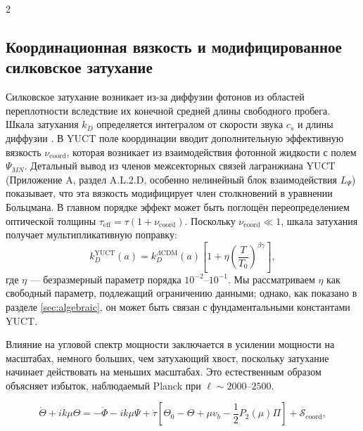 \documentclass[11pt,a4paper]{article}
\begin{document}
\begin{multicols}{2}
		\subsection{Координационная вязкость и модифицированное силковское затухание}
		
		Силковское затухание возникает из-за диффузии фотонов из областей переплотности вследствие их конечной средней длины свободного пробега. Шкала затухания $k_D$ определяется интегралом от скорости звука $c_s$ и длины диффузии \cite{Silk1968}. В YUCT поле координации вводит дополнительную эффективную вязкость $\nu_{\mathrm{coord}}$, которая возникает из взаимодействия фотонной жидкости с полем $\Psi_{MN}$. Детальный вывод из членов межсекторных связей лагранжиана YUCT (Приложение A, раздел A.L.2.D, особенно нелинейный блок взаимодействия $L_{\Psi}$) показывает, что эта вязкость модифицирует член столкновений в уравнении Больцмана. В главном порядке эффект может быть поглощён переопределением оптической толщины $\tau_{\mathrm{eff}} = \tau (1 + \nu_{\mathrm{coord}})$. Поскольку $\nu_{\mathrm{coord}} \ll 1$, шкала затухания получает мультипликативную поправку:
		\begin{equation}
			k_D^{\text{YUCT}}(a) = k_D^{\Lambda\text{CDM}}(a) \left[1 + \eta \left(\frac{T}{T_0}\right)^{\beta\gamma}\right],
			\label{eq:kD}
		\end{equation}
		где $\eta$ — безразмерный параметр порядка $10^{-2}$--$10^{-1}$. Мы рассматриваем $\eta$ как свободный параметр, подлежащий ограничению данными; однако, как показано в разделе \ref{sec:algebraic}, он может быть связан с фундаментальными константами YUCT.
		
		Влияние на угловой спектр мощности заключается в усилении мощности на масштабах, немного больших, чем затухающий хвост, поскольку затухание начинает действовать на меньших масштабах. Это естественным образом объясняет избыток, наблюдаемый Planck при $\ell \sim 2000$--$2500$.
		
	\end{multicols}
	
	\begin{equation}
		\dot{\Theta} + ik\mu\Theta = -\dot{\Phi} - ik\mu\Psi + \dot{\tau}\left[\Theta_0 - \Theta + \mu v_b - \frac{1}{2}P_2(\mu)\Pi\right] + \mathcal{S}_{\mathrm{coord}},
		\label{eq:boltzmann}
	\end{equation}
	
\end{document}
